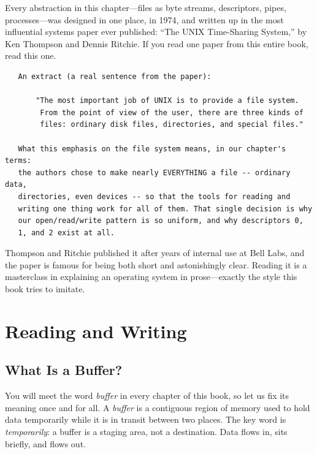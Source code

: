 \begin{researchnote}
Every abstraction in this chapter---files as byte streams, descriptors,
pipes, processes---was designed in one place, in 1974, and written up
in the most influential systems paper ever published: ``The UNIX
Time-Sharing System,'' by Ken Thompson and Dennis Ritchie. If you read
one paper from this entire book, read this one.

\begin{verbatim}
   An extract (a real sentence from the paper):

       "The most important job of UNIX is to provide a file system.
        From the point of view of the user, there are three kinds of
        files: ordinary disk files, directories, and special files."

   What this emphasis on the file system means, in our chapter's terms:
   the authors chose to make nearly EVERYTHING a file -- ordinary data,
   directories, even devices -- so that the tools for reading and
   writing one thing work for all of them. That single decision is why
   our open/read/write pattern is so uniform, and why descriptors 0,
   1, and 2 exist at all.
\end{verbatim}

Thompson and Ritchie published it after years of internal use at Bell
Labs, and the paper is famous for being both short and astonishingly
clear. Reading it is a masterclass in explaining an operating system
in prose---exactly the style this book tries to imitate.

\end{researchnote}

\section{Reading and Writing}

\subsection{What Is a Buffer?}

You will meet the word \emph{buffer} in every chapter of this book, so
let us fix its meaning once and for all. A \emph{buffer} is a
contiguous region of memory used to hold data temporarily while it is
in transit between two places. The key word is \emph{temporarily}: a
buffer is a staging area, not a destination. Data flows in, sits
briefly, and flows out.

